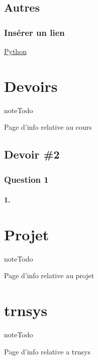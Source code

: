 \documentclass[letterpaper,10pt,english]{sphinxmanual}
\begin{document}
\section{Autres}
\label{sphinx:autres}

\subsection{Insérer un lien}
\label{sphinx:inserer-un-lien}
\href{http://www.python.org/}{Python}


\chapter{Devoirs}
\label{devoir::doc}\label{devoir:devoirs}
\begin{notice}{note}{Todo}

Page d'info relative au cours
\end{notice}


\section{Devoir \#2}
\label{devoir:devoir-2}

\subsection{Question 1}
\label{devoir:question-1}

\subsubsection{1.}
\label{devoir:id1}

\chapter{Projet}
\label{projet::doc}\label{projet:projet}
\begin{notice}{note}{Todo}

Page d'info relative au projet
\end{notice}


\chapter{trnsys}
\label{trnsys::doc}\label{trnsys:trnsys}
\begin{notice}{note}{Todo}

Page d'info relative a trnsys
\end{notice}
\end{document}
